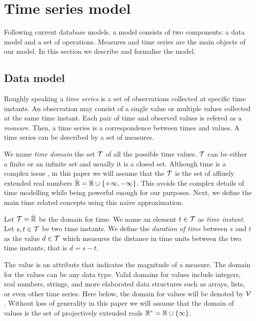 
\section{Time series model}
\label{sec:model:TSMS}

Following current database models, a  model consists of two
components: a data model and a set of operations. Measures and time
series are the main objects of our  model. 
%
In this section we describe and formalise the  model. 


\subsection{Data model}

Roughly speaking a \emph{time series} is a set of observations
collected at specific time instants. An observation may consist of a
single value or multiple values collected at the same time instant.
Each pair of time and observed values is refered as a
\emph{measure}. Then, a time series is a correspondence between times
and values. A time series can be described by a set of measures.

We name \emph{time domain} the set $\cal{T}$ of all the possible time
values. $\cal{T}$ can be either a finite or an infinite set and
usually it is a closed set. Although time is a complex issue
\cite{iep:time-supplement}, in this paper we will assume that the
$\cal{T}$ is the set of affinely extended real numbers $\bar{\mathbb{R}} = \mathbb{R} \cup
\{+\infty,-\infty\}$. This avoids the complex details of time
modelling while being powerful enough for our purposes. Next, we
define the main time related concepts using this naive approximation.



\begin{definition}
  \label{def:model:temps}
  Let $\cal{T}=\bar{\mathbb{R}}$ be the domain for time.
  We name an element $t\in\cal{T}$ as \emph{time instant}.
  Let $s,t\in\cal{T}$ be two time instants.  We define the
  \emph{duration of time} between $s$ and $t$ as the value $d
  \in\cal{T}$ which measures the distance in time units between the
  two time instants, that is $d =s-t$.
\end{definition}

The value is an attribute that indicates the magnitude of a
measure. The domain for the values can be any data type. Valid domains
for values include integers, real numbers, strings, and more
elaborated data structures such as arrays, lists, or even other time
series. Here below, the domain for values will be denoted by
$\cal{V}$. 
%
Without loss of generality in this paper we will assume that the
domain of values is the set of projectively extended reals $\mathbb{R}^{*} = \mathbb{R}
\cup \{\infty\}$.

